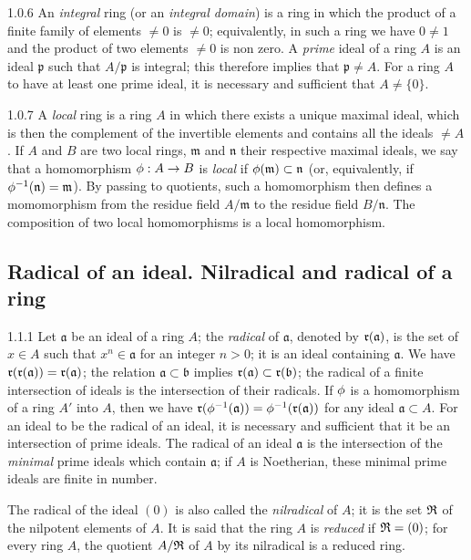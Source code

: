 \begin{env}{1.0.6}
\label{env-0.1.0.6}
An \emph{integral} ring (or an \emph{integral domain}) is a ring in which the
product of a finite family of elements $\neq 0$ is $\neq 0$; equivalently, in
such a ring we have $0\neq 1$ and the product of two elements $\neq 0$ is non
zero. A \emph{prime} ideal of a ring $A$ is an ideal $\mathfrak{p}$ such that
$A/\mathfrak{p}$ is integral; this therefore implies that $\mathfrak{p}\neq A$.
For a ring $A$ to have at least one prime ideal, it is necessary and sufficient
that $A\neq\{0\}$.
\end{env}

\begin{env}{1.0.7}
\label{env-0.1.0.7}
A \emph{local} ring is a ring $A$ in which there exists a unique maximal ideal,
which is then the complement of the invertible elements and contains all the
ideals $\neq A$. If $A$ and $B$ are two local rings, $\mathfrak{m}$ and
$\mathfrak{n}$ their respective maximal ideals, we say that a homomorphism
$\phi:A\to B$ is \emph{local} if $\phi(\mathfrak{m})\subset\mathfrak{n}$ (or,
equivalently, if $\phi^{-1}(\mathfrak{n})=\mathfrak{m}$). By passing to
quotients, such a homomorphism then defines a momomorphism from the residue
field $A/\mathfrak{m}$ to the residue field $B/\mathfrak{n}$. The composition of
two local homomorphisms is a local homomorphism.
\end{env}

\subsection{Radical of an ideal. Nilradical and radical of a ring}
\label{0-prelim-1.1}

\begin{env}{1.1.1}
\label{env-0.1.1.1}
Let $\mathfrak{a}$ be an ideal of a ring $A$; the \emph{radical} of
$\mathfrak{a}$, denoted by $\mathfrak{r}(\mathfrak{a})$, is the set of $x\in A$ such
that $x^n\in\mathfrak{a}$ for an integer $n>0$; it is an ideal containing
$\mathfrak{a}$. We have $\mathfrak{r}(\mathfrak{r}(\mathfrak{a}))=\mathfrak{r}(\mathfrak{a})$;
the relation $\mathfrak{a}\subset\mathfrak{b}$ implies
$\mathfrak{r}(\mathfrak{a})\subset\mathfrak{r}(\mathfrak{b})$; the radical of a finite
intersection of ideals is the intersection of their radicals. If $\phi$ is a
homomorphism of a ring $A'$ into $A$, then we have
$\mathfrak{r}(\phi^{-1}(\mathfrak{a}))=\phi^{-1}(\mathfrak{r}(\mathfrak{a}))$ for any ideal
$\mathfrak{a}\subset A$. For an ideal to be the radical of an ideal, it is
necessary and sufficient that it be an intersection of prime ideals. The radical
of an ideal $\mathfrak{a}$ is the intersection of the \emph{minimal} prime
ideals which contain $\mathfrak{a}$; if $A$ is Noetherian, these minimal prime
ideals are finite in number.

The radical of the ideal $(0)$ is also called the \emph{nilradical} of $A$; it
is the set $\mathfrak{R}$ of the nilpotent elements of $A$. It is said that the ring
$A$ is \emph{reduced} if $\mathfrak{R}=(0)$; for every ring $A$, the quotient
$A/\mathfrak{R}$ of $A$ by its nilradical is a reduced ring.
\end{env}

